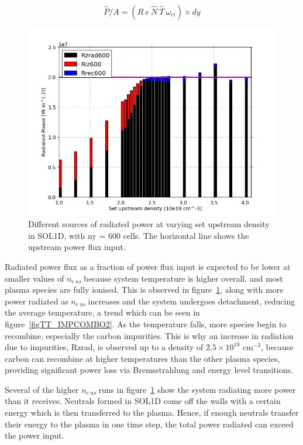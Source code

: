 \documentclass[12pt]{article}  %
\providecommand{\noNe}[1]{{${#1}\times 10^{19}$ cm$^{-3}$}} %
\providecommand{\neus}{$n_{e~us}~$} %
\begin{document}
\begin{equation}\label{eqRpflux}
\hat{P}/A = (R~e~\hat{N}~\hat{T}~\omega_{ci}) \times dy
\end{equation}

\begin{figure}
\includegraphics[scale=0.5]{Figures/sol1d/PRbar600.png}
\centering
{}\caption{Different sources of radiated power at varying set upstream density in SOL1D, with ny = 600 cells. The horizontal line shows the upstream power flux input.}\label{figPRbar600}
\end{figure}

Radiated power flux as a fraction of power flux input is expected to be lower at smaller values of \neus because system temperature is higher overall, and most plasma species are fully ionised. This is observed in figure~\ref{figPRbar600}, along with more power radiated as \neus increases and the system undergoes detachment, reducing the average temperature, a trend which can be seen in figure~\ref{figTT_IMPCOMBO2}. As the temperature falls, more species begin to recombine, especially the carbon impurities. This is why an increase in radiation due to impurities, Rzrad, is observed up to a density of \noNe{2.5}, because carbon can recombine at higher temperatures than the other plasma species, providing significant power loss via Bremsstrahlung and energy level transitions.

Several of the higher \neus runs in figure~\ref{figPRbar600} show the system radiating more power than it receives. Neutrals formed in SOL1D come off the walls with a certain energy which is then transferred to the plasma. Hence, if enough neutrals transfer their energy to the plasma in one time step, the total power radiated can exceed the power input.
\end{document}
